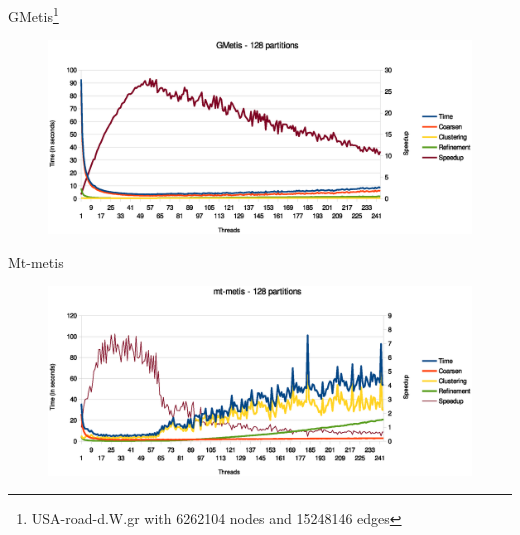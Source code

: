 \documentclass{beamer}
\begin{document}
\begin{frame}{GMetis\footnote{USA-road-d.W.gr with 6262104 nodes and
  15248146 edges}}
\begin{center}
  \begin{figure}[htbp]
    \includegraphics[scale=.45]{gmetis128.eps}
  \end{figure}
\end{center}
\end{frame}



\begin{frame}{Mt-metis}
\begin{center}
  \begin{figure}[htbp]
    \includegraphics[scale=.45]{img/mtmetis128.eps}
  \end{figure}
\end{center}
\end{frame}
\end{document}
